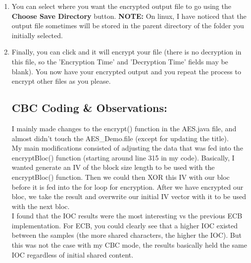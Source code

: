 \documentclass[10pt]{article}
\begin{document}
\begin{enumerate}
	\item You can select where you want the encrypted output file to go using the \textbf{Choose Save Directory} button. \textbf{NOTE:} On linux, I have noticed that the output file sometimes will be stored in the parent directory of the folder you initially selected. 
	
	\item Finally, you can click  and it will encrypt your file (there is no decryption in this file, so the 'Encryption Time' and  'Decryption Time' fields may be blank). You now have your encrypted output and you repeat the process to encrypt other files as you please.
	
	\subsection{CBC Coding \& Observations: }
	\noindent I mainly made changes to the encrypt() function in the AES.java file, and almost didn't touch the AES\_Demo.file (except for updating the title). \\
	My main modifications consisted of adjusting the data that was fed into the encryptBloc() function (starting around line 315 in my code). Basically, I wanted generate an IV of the block size length to be used with the encryptBloc() function. Then we could then XOR this IV with our bloc before it is fed into the for loop for encryption. After we have encrypted our bloc, we take the result and overwrite our initial IV vector with it to be used with the next bloc.\\
	\newline
	\noindent I found that the IOC results were the most interesting vs the previous ECB implementation. For ECB, you could clearly see that a higher IOC existed between the samples (the more shared characters, the higher the IOC). But this was not the case with my CBC mode, the results basically held the same IOC regardless of initial shared content.

\end{enumerate}
\vspace{0.2in}
\end{document}

